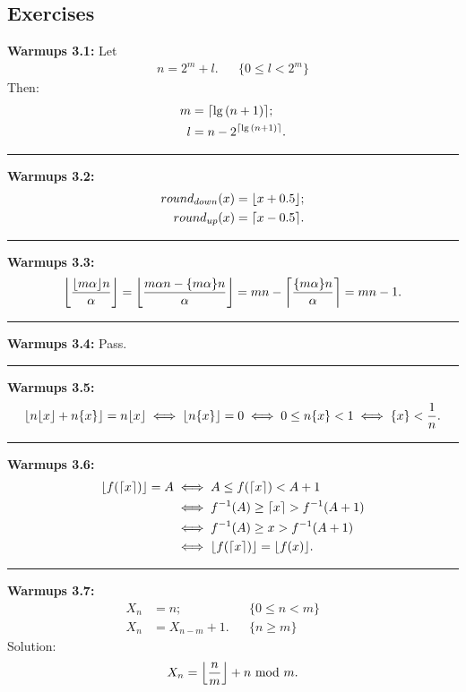 \documentclass{article}
\DeclarePairedDelimiter\ceil{\lceil}{\rceil}
\DeclarePairedDelimiter\floor{\lfloor}{\rfloor}
\begin{document}
\subsection{Exercises}
\textbf{Warmups 3.1:}
Let
\begin{align}
n = 2^m + l. && \{0 \le l < 2^m\}
\end{align}
Then:
\begin{align}
m &= \ceil{\lg{(n+1)}}; \\
l &= n - 2^{\ceil{\lg{(n+1)}}}.
\end{align}

\noindent\rule{\textwidth}{0.4pt}
\textbf{Warmups 3.2:}
\begin{align}
round_{down}(x) = \floor{x + 0.5}; \\
round_{up}(x) = \ceil{x - 0.5}.
\end{align}

\noindent\rule{\textwidth}{0.4pt}
\textbf{Warmups 3.3:}
\begin{align}
\floor*{\frac{\floor{m\alpha}n}{\alpha}} = \floor*{\frac{m\alpha n - \{m\alpha\}n}{\alpha}} = mn - \ceil*{\frac{\{m\alpha\}n}{\alpha}} = mn - 1.
\end{align}

\noindent\rule{\textwidth}{0.4pt}
\textbf{Warmups 3.4:}
Pass.

\noindent\rule{\textwidth}{0.4pt}
\textbf{Warmups 3.5:}
\begin{align}
\floor{n\floor{x} + n\{x\}} = n\floor{x} \iff \floor{n\{x\}} = 0 \iff 0 \le n\{x\} < 1 \iff \{x\} < \frac{1}{n}.
\end{align}

\noindent\rule{\textwidth}{0.4pt}
\textbf{Warmups 3.6:}
\begin{align}
\floor{f(\ceil{x})} = A &\iff A \le f(\ceil{x}) < A + 1 \\
			&\iff  f^{-1}(A) \ge \ceil{x} > f^{-1}(A+1) \\
			&\iff f^{-1}(A) \ge x > f^{-1}(A+1) \\
			&\iff \floor{f(\ceil{x})} = \floor{f(x)}.
\end{align}

\noindent\rule{\textwidth}{0.4pt}
\textbf{Warmups 3.7:}
\begin{align}
X_n &= n; && \{0 \le n < m\}\\
X_n &= X_{n-m} + 1. && \{n \ge m\}&& 
\end{align}
Solution:
\begin{align}
X_n = \floor*{\frac{n}{m}} + n \text{ mod } m.
\end{align}
\end{document}
